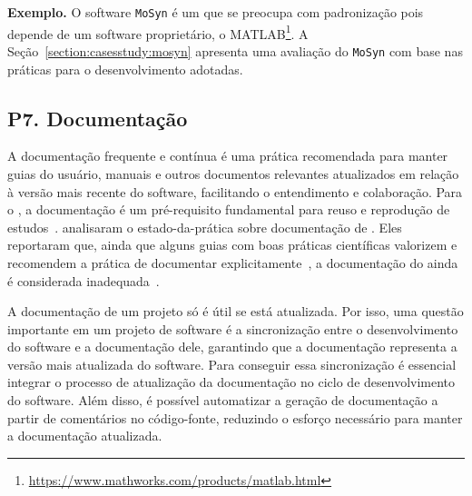 \noindent\textbf{Exemplo.} O software \texttt{MoSyn} é um \RSw que se preocupa com padronização pois depende de um software proprietário, o  MATLAB\footnote{\url{https://www.mathworks.com/products/matlab.html}}. A Seção~\ref{section:casesstudy:mosyn} apresenta uma avaliação do \texttt{MoSyn} com base nas práticas para o desenvolvimento adotadas.


\subsection*{P7. Documentação} 

A documentação frequente e contínua é uma prática recomendada para manter guias do usuário, manuais e outros documentos relevantes atualizados em relação à versão mais recente do software, facilitando o entendimento e colaboração.
Para o \RS, a documentação é um pré-requisito fundamental para reuso e reprodução de estudos~\cite{chue_hong_fair_2022}.
%
\cite{herman:2022} analisaram o estado-da-prática sobre documentação de \RS. Eles reportaram que, ainda que alguns guias com boas práticas científicas valorizem e recomendem a prática de documentar explicitamente~\cite{deutsche_forschungsgemeinschaft_2022_6472827},  
a documentação do \RSw ainda é considerada inadequada~\cite{wilson2017good, chue_hong_fair_2022}.


%

A documentação de um projeto só é útil se está atualizada. Por isso, uma questão importante em um projeto de software é a sincronização entre o desenvolvimento do software e a documentação dele, garantindo que a documentação representa a versão mais atualizada do software. 
Para conseguir essa sincronização é essencial integrar o processo de atualização da documentação no ciclo de desenvolvimento do software. Além disso, é possível automatizar a geração de documentação a partir de comentários no código-fonte, reduzindo o esforço necessário para manter a documentação atualizada.

